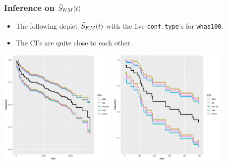 \documentclass[10pt]{beamer}\usepackage[]{graphicx}\usepackage[]{color}
\newcommand{\code}[1]{{\texttt{#1}}}
\newcommand{\Skm}{\widehat{S}_{\scriptsize{KM}}}
\begin{document}
\begin{frame}
\frametitle{Inference on $\Skm(t)$}
  \begin{itemize}
    \item The following depict $\Skm(t)$ with the five \code{conf.type}'s for \code{whas100}.
    \item The CI's are quite close to each other.
  \end{itemize}
  \begin{center}
    \includegraphics[height = 5.7cm]{kmplot} \hspace{.02cm}
    \includegraphics[height = 5.7cm]{kmplot2}
  \end{center}
\end{frame}
\end{document}
